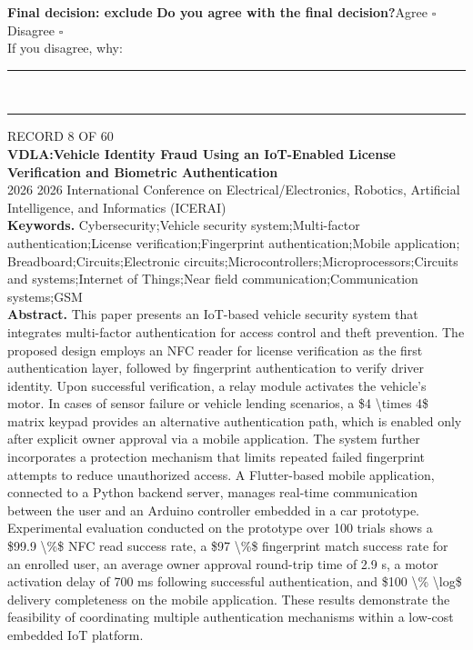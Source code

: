 \documentclass[11pt,a4paper]{article}
\begin{document}
{\small\textbf{Final decision: exclude}}
\vspace{2mm}
{\small\textbf{Do you agree with the final decision?}\quad{}Agree $\square$\qquad{}Disagree $\square$}\\[1mm]
{\footnotesize\color{soft}If you disagree, why:}\\[1mm]
\color{rule}\rule{\linewidth}{0.3pt}\\[3mm]\rule{\linewidth}{0.3pt}\color{black}
\clearpage
{\color{soft}\footnotesize RECORD 8 OF 60}\\[1mm]
{\large\bfseries VDLA:Vehicle Identity Fraud Using an IoT-Enabled License Verification and Biometric Authentication}\\[1.5mm]
{\color{soft}\small 2026 \textperiodcentered{} 2026 International Conference on Electrical/Electronics, Robotics, Artificial Intelligence, and Informatics (ICERAI)}\\[2mm]
{\small\textbf{Keywords.} Cybersecurity;Vehicle security system;Multi-factor authentication;License verification;Fingerprint authentication;Mobile application; Breadboard;Circuits;Electronic circuits;Microcontrollers;Microprocessors;Circuits and systems;Internet of Things;Near field communication;Communication systems;GSM}\\[2mm]
{\small\textbf{Abstract.} This paper presents an IoT-based vehicle security system that integrates multi-factor authentication for access control and theft prevention. The proposed design employs an NFC reader for license verification as the first authentication layer, followed by fingerprint authentication to verify driver identity. Upon successful verification, a relay module activates the vehicle's motor. In cases of sensor failure or vehicle lending scenarios, a \$4 \textbackslash{}times 4\$ matrix keypad provides an alternative authentication path, which is enabled only after explicit owner approval via a mobile application. The system further incorporates a protection mechanism that limits repeated failed fingerprint attempts to reduce unauthorized access. A Flutter-based mobile application, connected to a Python backend server, manages real-time communication between the user and an Arduino controller embedded in a car prototype. Experimental evaluation conducted on the prototype over 100 trials shows a \$99.9 \textbackslash{}\%\$ NFC read success rate, a \$97 \textbackslash{}\%\$ fingerprint match success rate for an enrolled user, an average owner approval round-trip time of 2.9 s, a motor activation delay of 700 ms following successful authentication, and \$100 \textbackslash{}\% \textbackslash{}log\$ delivery completeness on the mobile application. These results demonstrate the feasibility of coordinating multiple authentication mechanisms within a low-cost embedded IoT platform.}
\end{document}
